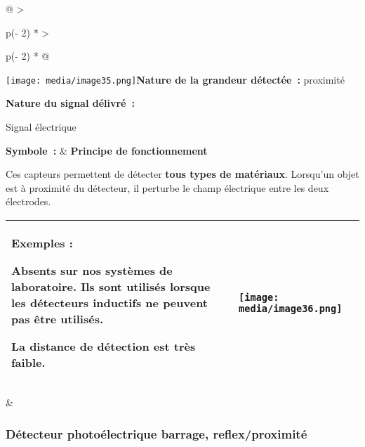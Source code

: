 \documentclass[
]{article}
\begin{document}
\begin{longtable}[]{@{}
  >{\raggedright\arraybackslash}p{(\columnwidth - 2\tabcolsep) * }
  >{\raggedright\arraybackslash}p{(\columnwidth - 2\tabcolsep) * }@{}}
\toprule
\texttt{[image: media/image35.png]}\textbf{Nature
de la grandeur détectée~:} proximité

\textbf{Nature du signal délivré~:}

Signal électrique

\textbf{Symbole~:} & \textbf{Principe de fonctionnement}

Ces capteurs permettent de détecter \textbf{tous types de matériaux}.
Lorsqu'un objet est à proximité du détecteur, il perturbe le champ
électrique entre les deux électrodes. \\
\midrule
\endhead
\begin{minipage}[t]{\linewidth}\raggedright
\begin{longtable}[]{@{}
  >{\raggedright\arraybackslash}p{}
  >{\raggedright\arraybackslash}p{}@{}}
\toprule
\endhead
\textbf{Exemples :}

Absents sur nos systèmes de laboratoire. Ils sont utilisés lorsque les
détecteurs inductifs ne peuvent pas être utilisés.

La distance de détection est très faible. &
\texttt{[image: media/image36.png]} \\
\bottomrule
\end{longtable}
\end{minipage} & \\
\bottomrule
\end{longtable}

\hypertarget{duxe9tecteur-photouxe9lectrique-barrage-reflexproximituxe9-1}{%
\subsubsection{Détecteur photoélectrique barrage,
reflex/proximité}\label{duxe9tecteur-photouxe9lectrique-barrage-reflexproximituxe9-1}}
\end{document}
